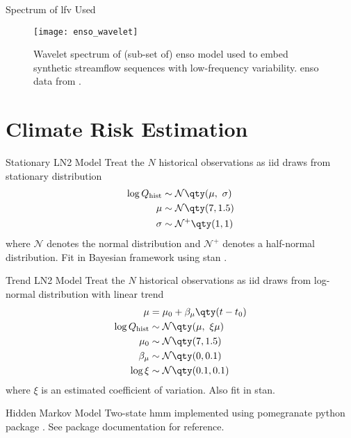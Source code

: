 \documentclass[
  10pt,     %
]{beamer}
\newcommand{\normal}{\mathcal{N}}
\begin{document}
\begin{frame}{Spectrum of \gls{lfv} Used}
  \begin{figure}
    \texttt{[image: enso\_wavelet]}
    \caption{
      Wavelet spectrum of (sub-set of) \gls{enso} model used to embed synthetic streamflow sequences with low-frequency variability.
      \gls{enso} data from \citet{Ramesh:2016hf}.
    }
  \end{figure}
\end{frame}

\section{Climate Risk Estimation}

\begin{frame}{Stationary LN2 Model}
  Treat the $N$ historical observations as \gls{iid} draws from stationary distribution
  \begin{align}\label{eq:ln2-stationary}
    \begin{split}
      \log Q_\text{hist} & \sim \normal \qty(\mu, \ \sigma) \\
      \mu &\sim \normal \qty(7, 1.5) \\
      \sigma &\sim \normal^+ \qty(1, 1)
    \end{split}
  \end{align}
  where $\normal$ denotes the normal distribution and $\normal^+$ denotes a half-normal distribution.
  Fit in Bayesian framework using stan \citep{Carpenter:2017ke}.
\end{frame}

\begin{frame}{Trend LN2 Model}
  Treat the $N$ historical observations as \gls{iid} draws from log-normal distribution with linear trend
  \begin{align}\label{eq:ln2-trend}
    \begin{split}
      \mu &= \mu_0 + \beta_\mu \qty(t - t_0) \\
    \log Q_\text{hist} & \sim \normal \qty(\mu, \ \xi \mu) \\
    \mu_0 & \sim \normal \qty(7, 1.5) \\
    \beta_\mu & \sim \normal \qty(0, 0.1) \\
    \log \xi & \sim \normal \qty(0.1, 0.1)
    \end{split}
  \end{align}
  where $\xi$ is an estimated coefficient of variation.
  Also fit in stan.
\end{frame}

\begin{frame}{Hidden Markov Model}
  Two-state \gls{hmm} \citep[see][]{Rabiner:1986jk} implemented using pomegranate python package \citep{Schreiber:2017tg}.
  See package documentation for reference.
\end{frame}
\end{document}

